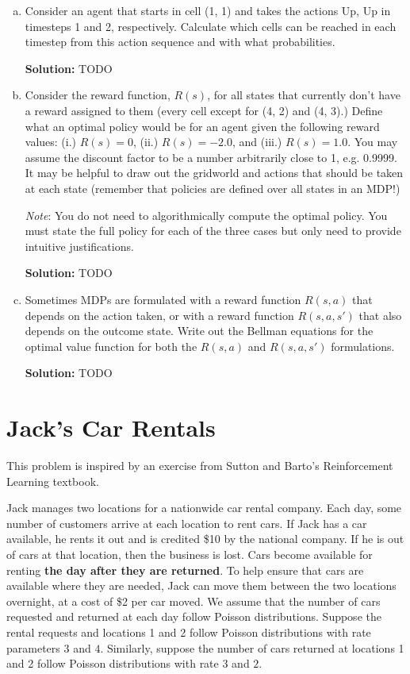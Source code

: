 \documentclass{article}
\newcommand{\Question}[1]{\Large \section{ #1 } \normalsize}
\newenvironment{solution}{\color{blue} \smallskip \textbf{Solution:}}{}
\begin{document}
\begin{enumerate}[(a)]
\item Consider an agent that starts in cell (1, 1) and takes the actions Up, Up in timesteps 1 and 2, respectively. Calculate which cells can be reached in each timestep from this action sequence and with what probabilities.

\begin{solution}
TODO
\end{solution}

\clearpage
\item
Consider the reward function, $R(s)$, for all states that currently don't have a reward assigned to them (every cell except for (4, 2) and (4, 3).) Define what an optimal policy would be for an agent given the following reward values: (i.) $R(s) = 0$, (ii.) $R(s) = -2.0$, and (iii.) $R(s) = 1.0$. You may assume the discount factor to be a number arbitrarily close to 1, e.g. 0.9999. It may be helpful to draw out the gridworld and actions that should be taken at each state (remember that policies are defined over all states in an MDP!)

\emph{Note}: You do not need to algorithmically compute the optimal policy. You must state the full policy for each of the three cases but only need to provide intuitive justifications.

\begin{solution}
TODO
\end{solution}

\clearpage
\item
Sometimes MDPs are formulated with a reward function $R(s, a)$ that depends on the action taken, or with a reward function $R(s, a, s')$ that also depends on the outcome state. Write out the Bellman equations for the optimal value function for both the $R(s, a)$ and $R(s, a, s')$ formulations.

\begin{solution}
TODO
\end{solution}
\end{enumerate}

\clearpage
\Question{Jack's Car Rentals}
This problem is inspired by an exercise from Sutton and Barto's Reinforcement Learning textbook.

Jack manages two locations for a nationwide car rental company. Each day, some number of customers arrive at each location to rent cars. If Jack has a car available, he rents it out and is credited \$10 by the national company. If he is out of cars at that location, then the business is lost. Cars become available for renting \textbf{the day after they are returned}. To help ensure that cars are available where they are needed, Jack can move them between the two locations overnight, at a cost of \$2 per car moved. We assume that the number of cars requested and returned at each day follow Poisson distributions. Suppose the rental requests and locations 1 and 2 follow Poisson distributions with rate parameters $3$ and $4$. Similarly, suppose the number of cars returned at locations 1 and 2 follow Poisson distributions with rate $3$ and $2$. 
\end{document}
